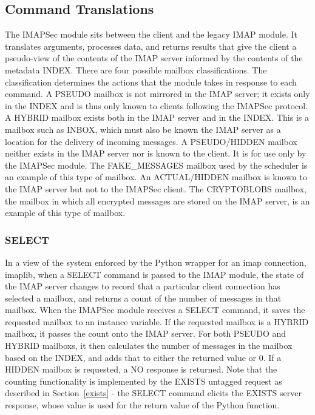\documentclass[pageno]{jpaper}
\newcommand{\project}{IMAPSec }
\begin{document}
\subsection{Command Translations}
The \project module sits between the client and the legacy IMAP module. It translates arguments, processes data, and returns results that give the client a pseudo-view of the contents of the IMAP server informed by the contents of the metadata INDEX. There are four possible mailbox classifications. The classification determines the actions that the module takes in response to each command. A PSEUDO mailbox is not mirrored in the IMAP server; it exists only in the INDEX and is thus only known to clients following the \project protocol. A HYBRID mailbox exists both in the IMAP server and in the INDEX. This is a mailbox such as INBOX, which must also be known the IMAP server as a location for the delivery of incoming messages. A PSEUDO/HIDDEN mailbox neither exists in the IMAP server nor is known to the client. It is for use only by the \project module. The FAKE\_MESSAGES mailbox used by the scheduler is an example of this type of mailbox. An ACTUAL/HIDDEN mailbox is known to the IMAP server but not to the \project client. The CRYPTOBLOBS mailbox, the mailbox in which all encrypted messages are stored on the IMAP server, is an example of this type of mailbox. 

\label{select}
\subsubsection{SELECT} In a view of the system enforced by the Python wrapper for an imap connection, imaplib, when a SELECT command is passed to the IMAP module, the state of the IMAP server changes to record that a particular client connection has selected a mailbox, and returns a count of the number of messages in that mailbox. When the \project module receives a SELECT command, it saves the requested mailbox to an instance variable. If the requested mailbox is a HYBRID mailbox, it passes the count onto the IMAP server. For both PSEUDO and HYBRID mailboxs, it then calculates the number of messages in the mailbox based on the INDEX, and adds that to either the returned value or 0. If a HIDDEN mailbox is requested, a NO response is returned. Note that the counting functionality is implemented by the EXISTS untagged request as described in Section~\ref{exists} - the SELECT command elicits the EXISTS server response, whose value is used for the return value of the Python function.
\end{document}
